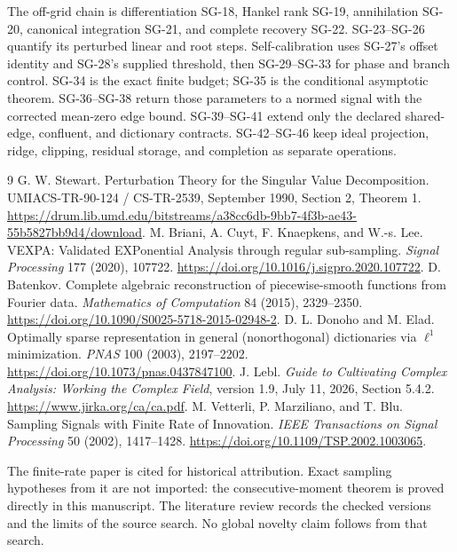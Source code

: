 \documentclass[11pt]{article}
\theoremstyle{definition}\newtheorem{definition}[theorem]{Definition}
\theoremstyle{remark}\newtheorem{remark}[theorem]{Remark}
\begin{document}
The off-grid chain is differentiation SG-18, Hankel rank SG-19,
annihilation SG-20, canonical integration SG-21, and complete recovery
SG-22. SG-23--SG-26 quantify its perturbed linear and root steps.
Self-calibration uses SG-27's offset identity and SG-28's supplied threshold,
then SG-29--SG-33 for phase and branch control. SG-34 is the exact finite
budget; SG-35 is the conditional asymptotic theorem. SG-36--SG-38 return
those parameters to a normed signal with the corrected mean-zero edge bound.
SG-39--SG-41 extend only the declared shared-edge, confluent, and dictionary
contracts. SG-42--SG-46 keep ideal projection, ridge, clipping, residual
storage, and completion as separate operations.

\clearpage
\begin{thebibliography}{9}
 G. W. Stewart.
Perturbation Theory for the Singular Value Decomposition.
UMIACS-TR-90-124 / CS-TR-2539, September 1990, Section 2, Theorem 1.
\url{https://drum.lib.umd.edu/bitstreams/a38cc6db-9bb7-4f3b-ae43-55b5827bb9d4/download}.
 M. Briani, A. Cuyt, F. Knaepkens, and W.-s. Lee.
VEXPA: Validated EXPonential Analysis through regular sub-sampling.
\emph{Signal Processing} 177 (2020), 107722.
\url{https://doi.org/10.1016/j.sigpro.2020.107722}.
 D. Batenkov.
Complete algebraic reconstruction of piecewise-smooth functions from Fourier data.
\emph{Mathematics of Computation} 84 (2015), 2329--2350.
\url{https://doi.org/10.1090/S0025-5718-2015-02948-2}.
 D. L. Donoho and M. Elad.
Optimally sparse representation in general (nonorthogonal) dictionaries
via $\ell^1$ minimization. \emph{PNAS} 100 (2003), 2197--2202.
\url{https://doi.org/10.1073/pnas.0437847100}.
 J. Lebl. \emph{Guide to Cultivating Complex Analysis:
Working the Complex Field}, version 1.9, July 11, 2026,
Section 5.4.2. \url{https://www.jirka.org/ca/ca.pdf}.
 M. Vetterli, P. Marziliano, and T. Blu.
Sampling Signals with Finite Rate of Innovation.
\emph{IEEE Transactions on Signal Processing} 50 (2002), 1417--1428.
\url{https://doi.org/10.1109/TSP.2002.1003065}.
\end{thebibliography}
The finite-rate paper is cited for historical attribution. Exact sampling
hypotheses from it are not imported: the consecutive-moment theorem is
proved directly in this manuscript. The literature review records the
checked versions and the limits of the source search. No global novelty
claim follows from that search.
\end{document}
